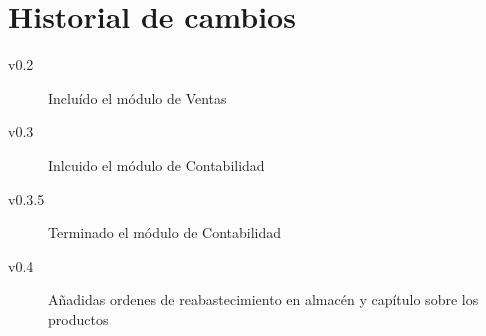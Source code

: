 \chapter*{Historial de cambios}
\begin{description}
  \item[v0.2] Incluído el módulo de Ventas
  \item[v0.3] Inlcuido el módulo de Contabilidad
  \item[v0.3.5] Terminado el módulo de Contabilidad
  \item[v0.4] Añadidas ordenes de reabastecimiento en almacén y capítulo sobre los productos
\end{description}

